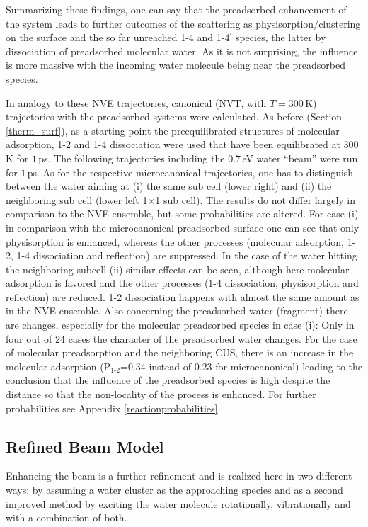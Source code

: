 \documentclass[11pt,DIV=13,BCOR=5mm,a4paper,headinclude]{scrbook}
\begin{document}
Summarizing these findings, one can say that the preadsorbed enhancement of the system leads to further outcomes of the scattering as physisorption/clustering on the surface and the so far unreached 1-4 and 1-4$^\prime$ species, the latter by dissociation of preadsorbed molecular water.
As it is not surprising, the influence is more massive with the incoming water molecule being near the preadsorbed species.


In analogy to these NVE trajectories, canonical (NVT, with $T=300\,$K) trajectories with the preadsorbed systems were calculated.
As before (Section \ref{therm_surf}), as a starting point the preequilibrated structures of molecular adsorption, 1-2 and 1-4 dissociation were used that have been equilibrated at $300\,$K for $1\,$ps.
The following trajectories including the $0.7\,$eV water ``beam'' were run for $1\,$ps.
As for the respective microcanonical trajectories, one has to distinguish between the water aiming at (i) the same sub cell (lower right) and (ii) the neighboring sub cell (lower left 1$\times$1 sub cell).
The results do not differ largely in comparison to the NVE ensemble, but some probabilities are altered.
For case (i) in comparison with the microcanonical preadsorbed surface one can see that only physisorption is enhanced, whereas the other processes (molecular adsorption, 1-2, 1-4 dissociation and reflection) are suppressed.
In the case of the water hitting the neighboring subcell (ii) similar effects can be seen, although here molecular adsorption is favored and the other processes (1-4 dissociation, physisorption and reflection) are reduced.
1-2 dissociation happens with almost the same amount as in the NVE ensemble.
Also concerning the preadsorbed water (fragment) there are changes, especially for the molecular preadsorbed species in case (i): Only in four out of 24 cases the character of the preadsorbed water changes.
For the case of molecular preadsorption and the neighboring CUS, there is an increase in the molecular adsorption (P$_\textrm{1-2}$=0.34 instead of 0.23 for microcanonical) leading to the conclusion that the influence of the preadsorbed species is high despite the distance so that the non-locality of the process is enhanced.
For further probabilities see Appendix \ref{reactionprobabilities}.

\subsection{Refined Beam Model}\label{refinedbeam}
Enhancing the beam is a further refinement and is realized here in two different ways: by assuming a water cluster as the approaching species and as a second improved method by exciting the water molecule rotationally, vibrationally and with a combination of both.
\end{document}
